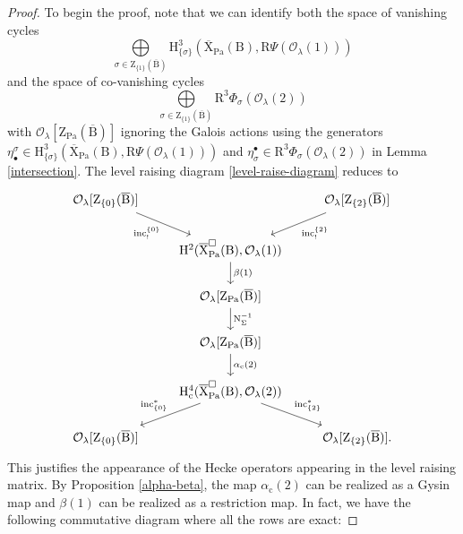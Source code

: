 \documentclass[10pt]{amsart}
\numberwithin{equation}{section}
\theoremstyle{definition}
\def\Pa{\mathrm{Pa}}
\def\calO{\mathcal{O}}
\def\rmc{\mathrm{c}}
\def\rmB{\mathrm{B}}
\def\rmH{\mathrm{H}}
\def\rmN{\mathrm{N}}
\def\rmR{\mathrm{R}}
\def\rmX{\mathrm{X}}
\def\rmZ{\mathrm{Z}}
\begin{document}
\begin{proof}
To begin the proof, note that we can identify both the space of vanishing cycles
\begin{equation*}
\bigoplus\limits_{\sigma\in \rmZ_{\{1\}}(\overline{\rmB})}\rmH^{3}_{\{\sigma\}}(\overline{\rmX}_{\Pa}(\rmB), \rmR\Psi(\calO_{\lambda}(1))) 
\end{equation*}
and the space of co-vanishing cycles
\begin{equation*}
\bigoplus\limits_{\sigma\in \rmZ_{\{1\}}(\overline{\rmB})}\rmR^{3}\Phi_{\sigma}(\calO_{\lambda}(2)) 
\end{equation*}
with $\calO_{\lambda}[\rmZ_{\Pa}(\overline{\rmB})]$ ignoring the Galois actions using the generators $\eta^{\sigma}_{\bullet}\in\rmH^{3}_{\{\sigma\}}(\overline{\rmX}_{\Pa}(\rmB), \rmR\Psi(\calO_{\lambda}(1)))$ and $\eta^{\bullet}_{\sigma}\in \rmR^{3}\Phi_{\sigma}(\calO_{\lambda}(2))$ in Lemma \ref{intersection}. The level raising diagram \eqref{level-raise-diagram} reduces to 
\begin{equation}
\begin{tikzcd}
 \calO_{\lambda}[\rmZ_{\{0\}}(\overline{\rmB})] \arrow[rd, "\mathrm{inc}^{\{0\}}_{!}"'] &                                    &  \calO_{\lambda}[\rmZ_{\{2\}}(\overline{\rmB})]\arrow[ld, "\mathrm{inc}^{\{2\}}_{!}"] \\
                   & \rmH^{2}(\overline{\rmX}^{\square}_{\Pa}(\rmB), \calO_{\lambda}(1)) \arrow[d, "\beta(1)"]                   &                   \\
                   & \calO_{\lambda}[\rmZ_{\Pa}(\overline{\rmB})] \arrow[d, "\rmN^{-1}_{\Sigma}"]   &\\
                   & \calO_{\lambda}[\rmZ_{\Pa}(\overline{\rmB})] \arrow[d, "\alpha_{\rmc}(2)"]                   &                   \\
                   &  \rmH^{4}_{\rmc}(\overline{\rmX}^{\square}_{\Pa}(\rmB), \calO_{\lambda}(2)) \arrow[ld, "\mathrm{inc}^{\ast}_{\{0\}}"'] \arrow[rd, "\mathrm{inc}^{\ast}_{\{2\}}"] &                   \\
 \calO_{\lambda}[\rmZ_{\{0\}}(\overline{\rmB})]            &                                    &   \calO_{\lambda}[\rmZ_{\{2\}}(\overline{\rmB})].            
\end{tikzcd}
\end{equation}
This justifies the appearance of the Hecke operators appearing in the level raising matrix.
By Proposition \ref{alpha-beta}, the map $\alpha_{\rmc}(2)$ can be realized as a Gysin map and $\beta(1)$ can be realized as a restriction map. In fact, we have the following  commutative diagram where all the rows are exact:

\end{proof}
\end{document}
